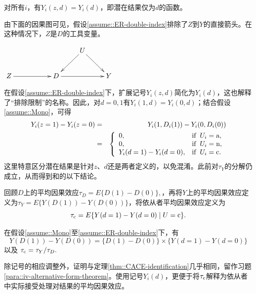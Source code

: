 \begin{assumption}[排除限制]
\label{assume::ER-double-index}
对所有$i$，有$Y_i(z,d) = Y_i(d)$，即潜在结果仅为$d$的函数。
\end{assumption}


由下面的因果图可见，假设\ref{assume::ER-double-index}排除了$Z$到$Y$的直接箭头。在这种情况下，$Z$是$D$的工具变量。 
\begin{center}
$
\xymatrix{
 && & U  \ar[dl] \ar[dr] &\\
Z \ar[rr] &&D \ar[rr]&&Y
}
$
\end{center}
在假设\ref{assume::ER-double-index}下，扩展记号$Y_i(z,d)$简化为$Y_i(d)$，这也解释了“排除限制”的名称。因此，对$d=0,1$有$Y_i(1,d) = Y_i(0,d)$；结合假设\ref{assume::Mono}，可得
\begin{eqnarray*}
Y_i(z=1) - Y_i(z=0) &=& Y_i(1, D_i(1)) - Y_i(0, D_i(0)) \\
&=& \left \{ \begin{array} {ll}
0 , & \text{if} \hspace{2mm}  U_i = \textup{a}, \\
0 , & \text{if}  \hspace{2mm}  U_i = \textup{n},\\
Y_i(d=1) - Y_i(d=0) ,& \text{if} \hspace{2mm} U_i = \textup{c}.
\end{array}
\right.  
\end{eqnarray*}
这里特意区分潜在结果是针对$z$、$d$还是两者定义的，以免混淆。此前对$\tau_Y$的分解仍成立，从而得到\citet{imbens1994identification}和\citet{angrist1996identification}的以下结论。

回顾$D$上的平均因果效应$\tau_D = E\{D(1)  - D(0) \},$，再将$Y$上的平均因果效应定义为$\tau_Y = E\{ Y(D(1)) - Y(D(0))  \}$，将依从者平均因果效应定义为
$$
\tau_{\textup{c}} =  E\{  Y(d=1) - Y(d=0) \mid U = \textup{c} \}.
$$

\begin{theorem}\label{thm::iv-double-index}
在假设\ref{assume::Mono}至\ref{assume::ER-double-index}下，有
$$
Y(D(1)) - Y(D(0)) = \{  D(1)  - D(0) \} \times \{ Y(d=1) - Y(d=0) \}
$$
以及
$
\tau_{\textup{c}}   =   \tau_Y /  \tau_D  .
$
\end{theorem}

除记号的相应调整外，证明与定理\ref{thm::CACE-identification}几乎相同，留作习题\ref{para::iv-alternative-form-theorem}。使用记号$Y_i(d)$，更便于将$\tau_{\textup{c}}$解释为依从者中实际接受处理对结果的平均因果效应。 



 




